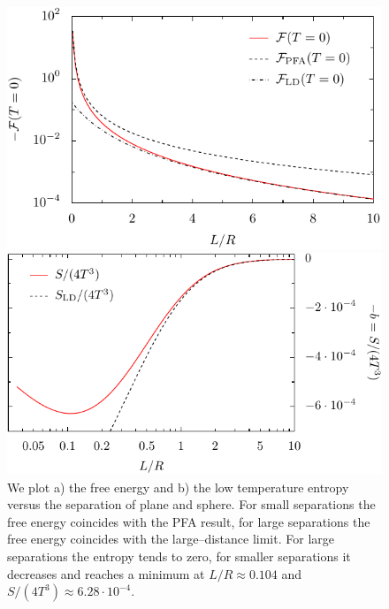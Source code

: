 \begin{figure}
\begin{minipage}[b]{.5\linewidth}
\centering
\includegraphics[scale=0.78]{plots/lowT_fit/F0.pdf}
\end{minipage}
\begin{minipage}[b]{.5\linewidth}
\centering
\includegraphics[scale=0.78]{plots/lowT_fit/S0.pdf}
\end{minipage}

\caption{We plot a) the free energy and b) the low temperature entropy versus
the separation of plane and sphere. For small separations the free energy
coincides with the PFA result, for large separations the free energy coincides
with the large--distance limit. For large separations the entropy tends to
zero, for smaller separations it decreases and reaches a minimum at $L/R
\approx 0.104$ and $S/(4T^3) \approx 6.28\cdot10^{-4}$.}
\label{fig:temp_lowT}
\end{figure}


